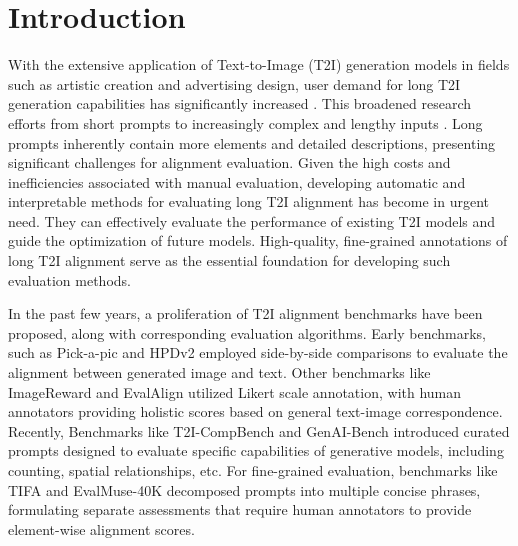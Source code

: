 \documentclass[letterpaper]{article} %
\begin{document}
\section{Introduction}

With the extensive application of Text-to-Image (T2I) generation models in fields such as artistic creation and advertising design, user demand for long T2I generation capabilities has significantly increased \cite{ko2023large, zhao2024enhancing, 10168279, sheng2025agiqa, yang2025language}. This broadened research efforts from short prompts to increasingly complex and lengthy inputs \cite{hu2024ella, liu2024improving}. Long prompts inherently contain more elements and detailed descriptions, presenting significant challenges for alignment evaluation. Given the high costs and inefficiencies associated with manual evaluation, developing automatic and interpretable methods for evaluating long T2I alignment has become in urgent need. They can effectively evaluate the performance of existing T2I models and guide the optimization of future models. High-quality, fine-grained annotations of long T2I alignment serve as the essential foundation for developing such evaluation methods.

In the past few years, a proliferation of T2I alignment benchmarks have been proposed, along with corresponding evaluation algorithms. Early benchmarks, such as Pick-a-pic \cite{kirstain2023pick} and HPDv2 \cite{wu2023human} employed side-by-side comparisons to evaluate the alignment between generated image and text. Other benchmarks like ImageReward \cite{xu2023imagereward} and EvalAlign \cite{tan2024evalalign} utilized Likert scale annotation, with human annotators providing holistic scores based on general text-image correspondence. Recently, Benchmarks like T2I-CompBench \cite{huang2023t2i} and GenAI-Bench \cite{li2024genai} introduced curated prompts designed to evaluate specific capabilities of generative models, including counting, spatial relationships, etc. For fine-grained evaluation, benchmarks like TIFA \cite{hu2023tifa} and EvalMuse-40K \cite{han2024evalmuse} decomposed prompts into multiple concise phrases, formulating separate assessments that require human annotators to provide element-wise alignment scores.
\end{document}
